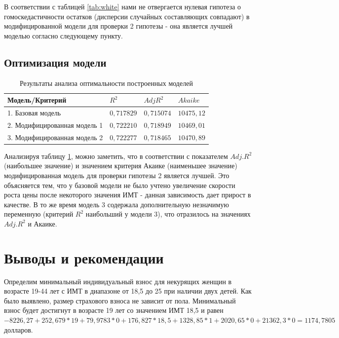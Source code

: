 \documentclass[a4paper,12pt]{article}
\begin{document}
В соответствии с таблицей \ref{tab:white} нами не отвергается нулевая гипотеза о гомоскедастичности остатков (дисперсии случайных составляющих совпадают) в модифицированной модели для проверки 2 гипотезы - она является лучшей моделью согласно следующему пункту. 

\subsection{Оптимизация модели}
\begin{table}[H]
	\begin{center}
		\begin{tabular}{ | l | l | l | l |}
			\hline
			Модель/Критерий & $R^2$ & $Adj R^2$ & $Akaike$ \\ \hline
			1. Базовая модель & $0,717829$ & $0,715074$ & $10475,12$ \\ \hline
			2. Модифицированная модель 1 & $0,722210$ & $0,718949$ & $10469,01$ \\ \hline
			3. Модифицированная модель 2 & $0,722277$ & $0,718465$ & $10470,89$ \\ \hline
		\end{tabular}
	\end{center}
	\caption{Результаты анализа оптимальности построенных моделей}
	\label{tab:optim}
\end{table}

Анализируя таблицу \ref{tab:optim}, можно заметить, что в соответствии с показателем $Adj. R^2$ (наибольшее значение) и значением критерия Акаике (наименьшее значение) модифицированная модель для проверки гипотезы 2 является лучшей. Это объясняется тем, что у базовой модели не было учтено увеличение скорости роста цены после некоторого значения ИМТ - данная зависимость дает прирост в качестве. В то же время модель 3 содержала дополнительную незначимую переменную (критерий $R^2$ наибольший у модели 3), что отразилось на значениях $Adj. R^2$ и Акаике.

\section{Выводы и рекомендации}
Определим минимальный индивидуальный взнос для некурящих женщин в возрасте 19-44 лет с ИМТ в диапазоне от 18,5 до 25 при наличии двух детей. Как было выявлено, размер страхового взноса не зависит от пола. Минимальный взнос будет достигнут в возрасте 19 лет со значением ИМТ 18,5 и равен $-8226,27 + 252,679 * 19 + 79,9783 * 0 + 176,827 * 18,5 + 1328,85 * 1  + 2020,65 * 0 + 21362,3 * 0 = 1174,7805$ долларов.
\end{document}
